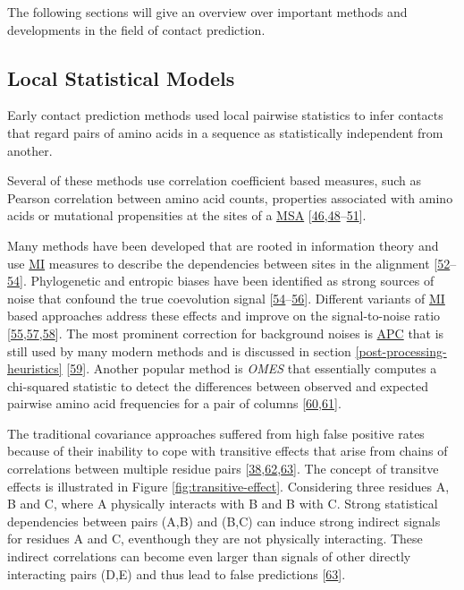 \documentclass[11pt,a4paper,twoside]{book}
\theoremstyle{definition}
\theoremstyle{definition}
\theoremstyle{remark}
\begin{document}
The following sections will give an overview over important methods and
developments in the field of contact prediction.

\subsection{Local Statistical Models}\label{local-methods}

Early contact prediction methods used local pairwise statistics to infer
contacts that regard pairs of amino acids in a sequence as statistically
independent from another.

Several of these methods use correlation coefficient based measures,
such as Pearson correlation between amino acid counts, properties
associated with amino acids or mutational propensities at the sites of a
\protect\hyperlink{abbrev}{MSA}
{[}\protect\hyperlink{ref-Gobel1994}{46},\protect\hyperlink{ref-Neher1994}{48}--\protect\hyperlink{ref-Shindyalov1994}{51}{]}.

Many methods have been developed that are rooted in information theory
and use \protect\hyperlink{abbrev}{MI} measures to describe the
dependencies between sites in the alignment
{[}\protect\hyperlink{ref-Clarke1995}{52}--\protect\hyperlink{ref-Martin2005}{54}{]}.
Phylogenetic and entropic biases have been identified as strong sources
of noise that confound the true coevolution signal
{[}\protect\hyperlink{ref-Martin2005}{54}--\protect\hyperlink{ref-Fodor2004}{56}{]}.
Different variants of \protect\hyperlink{abbrev}{MI} based approaches
address these effects and improve on the signal-to-noise ratio
{[}\protect\hyperlink{ref-Atchley2000}{55},\protect\hyperlink{ref-Tillier2003}{57},\protect\hyperlink{ref-Gouveia_Oliveira2007}{58}{]}.
The most prominent correction for background noises is
\protect\hyperlink{abbrev}{APC} that is still used by many modern
methods and is discussed in section \ref{post-processing-heuristics}
{[}\protect\hyperlink{ref-Dunn2008}{59}{]}. Another popular method is
\emph{OMES} that essentially computes a chi-squared statistic to detect
the differences between observed and expected pairwise amino acid
frequencies for a pair of columns
{[}\protect\hyperlink{ref-Kass2002}{60},\protect\hyperlink{ref-Noivirt2005}{61}{]}.

The traditional covariance approaches suffered from high false positive
rates because of their inability to cope with transitive effects that
arise from chains of correlations between multiple residue pairs
{[}\protect\hyperlink{ref-Weigt2009}{38},\protect\hyperlink{ref-Lapedes1999}{62},\protect\hyperlink{ref-Burger2010}{63}{]}.
The concept of transitve effects is illustrated in Figure
\ref{fig:transitive-effect}. Considering three residues A, B and C,
where A physically interacts with B and B with C. Strong statistical
dependencies between pairs (A,B) and (B,C) can induce strong indirect
signals for residues A and C, eventhough they are not physically
interacting. These indirect correlations can become even larger than
signals of other directly interacting pairs (D,E) and thus lead to false
predictions {[}\protect\hyperlink{ref-Burger2010}{63}{]}.
\end{document}
